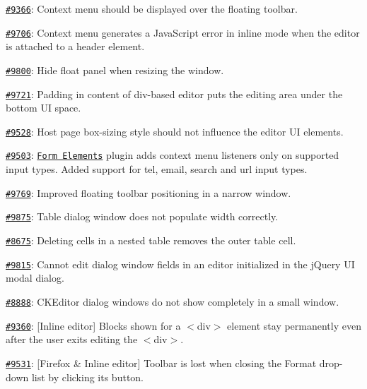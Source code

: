 \begin{DoxyItemize}
\begin{DoxyItemize}
\item \href{http://dev.ckeditor.com/ticket/9366}{\tt \#9366}\-: Context menu should be displayed over the floating toolbar.
\item \href{http://dev.ckeditor.com/ticket/9706}{\tt \#9706}\-: Context menu generates a Java\-Script error in inline mode when the editor is attached to a header element.
\end{DoxyItemize}
\item \href{http://dev.ckeditor.com/ticket/9800}{\tt \#9800}\-: Hide float panel when resizing the window.
\item \href{http://dev.ckeditor.com/ticket/9721}{\tt \#9721}\-: Padding in content of div-\/based editor puts the editing area under the bottom U\-I space.
\item \href{http://dev.ckeditor.com/ticket/9528}{\tt \#9528}\-: Host page {\ttfamily box-\/sizing} style should not influence the editor U\-I elements.
\item \href{http://dev.ckeditor.com/ticket/9503}{\tt \#9503}\-: \href{http://ckeditor.com/addon/forms}{\tt Form Elements} plugin adds context menu listeners only on supported input types. Added support for {\ttfamily tel}, {\ttfamily email}, {\ttfamily search} and {\ttfamily url} input types.
\item \href{http://dev.ckeditor.com/ticket/9769}{\tt \#9769}\-: Improved floating toolbar positioning in a narrow window.
\item \href{http://dev.ckeditor.com/ticket/9875}{\tt \#9875}\-: Table dialog window does not populate width correctly.
\item \href{http://dev.ckeditor.com/ticket/8675}{\tt \#8675}\-: Deleting cells in a nested table removes the outer table cell.
\item \href{http://dev.ckeditor.com/ticket/9815}{\tt \#9815}\-: Cannot edit dialog window fields in an editor initialized in the j\-Query U\-I modal dialog.
\item \href{http://dev.ckeditor.com/ticket/8888}{\tt \#8888}\-: C\-K\-Editor dialog windows do not show completely in a small window.
\item \href{http://dev.ckeditor.com/ticket/9360}{\tt \#9360}\-: \mbox{[}Inline editor\mbox{]} Blocks shown for a {\ttfamily $<$div$>$} element stay permanently even after the user exits editing the {\ttfamily $<$div$>$}.
\item \href{http://dev.ckeditor.com/ticket/9531}{\tt \#9531}\-: \mbox{[}Firefox \& Inline editor\mbox{]} Toolbar is lost when closing the Format drop-\/down list by clicking its button.

\end{DoxyItemize}
